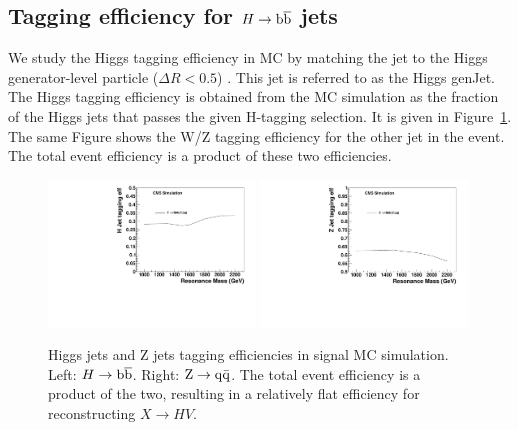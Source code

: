 





\subsection{Tagging efficiency for $H\to\mathrm{b\overline{b}}$ jets}


We study the Higgs tagging efficiency in MC by matching the jet to the Higgs 
generator-level particle ($\Delta R < 0.5$) .  This jet is referred to as the Higgs genJet. 
The Higgs tagging efficiency is obtained from the MC simulation as the
fraction of the Higgs jets that passes the given H-tagging selection.
It is given in Figure~\ref{fig:HEff}.  The same Figure shows the
W/Z tagging efficiency for the other jet in the event.  The total
event efficiency is a product of these two efficiencies.  

\begin{figure}[htb]
\begin{center}
\includegraphics[width=0.49\textwidth]{EXO-14-009/HbbZqqfigs/Signal/H-taggingEff-8TeV.pdf}
\includegraphics[width=0.49\textwidth]{EXO-14-009/HbbZqqfigs/Signal/Z-taggingEff-8TeV.pdf}
\end{center}
\caption{
  Higgs jets and Z jets tagging efficiencies in signal MC simulation.
  Left: $H\to\mathrm{b\overline{b}}$. Right: ${\rm Z}\to{\rm q\bar{q}}$.  The total event efficiency is a product
  of the two, resulting in a relatively flat efficiency for reconstructing
  $X \to HV$.
}
\label{fig:HEff}
\end{figure}



